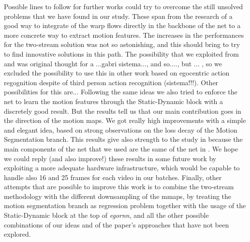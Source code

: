 \documentclass[10pt,twocolumn,hidelinks,letterpaper]{article}
\begin{document}
Possible lines to follow for further works could try to overcome the still unsolved problems that we have found in our study. These span from the research of a good way to integrate of the warp flows directly in the backbone of the net to a more concrete way to extract motion features. The increases in the performances for the two-stream solution was not so astonishing, and this should bring to try to find innovative solutions in this path. The possibility that we exploited from \cite{reprflow} and \cite{motfilt} was original thought for a ...gabri sistema..., and so...., but ... , so we excluded the possibility to use this in other work based on egocentric action regognition despite of third person action recognition (sistema!!!). Other possibilities for this are...
Following the same ideas we also tried to enforce the net to learn the motion features through the Static-Dynamic block with a discretely good result. But the results tell us that our main contribution goes in the direction of the motion maps. We got really high improvements with a simple and elegant idea, based on strong observations on the loss decay of the Motion Segmentation branch. This results give also strength to the study in \cite{sparnet} because the main components of the net that we used are the same of the net in \cite{sparnet}. We hope we could reply (and also improve!) these results in some future work by exploiting a more adequate hardware infrastructure, which would be capable to handle also 16 and 25 frames for each video in our batches. Finally, other attempts that are possible to improve this work is to combine the two-stream methodology with the different downsampling of the mmaps, by treating the motion segmentation branch as regression problem together with the usage of the Static-Dynamic block at the top of \textit{egornn}, and all the other possible combinations of our ideas and of the paper's approaches that have not been explored.



{\small


}
\end{document}
